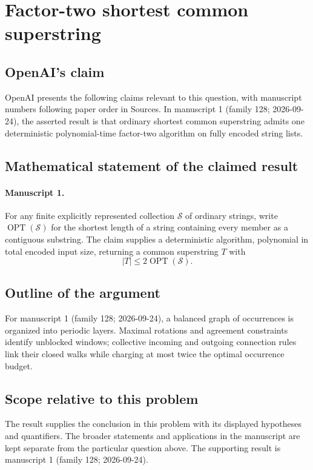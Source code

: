 \documentclass[11pt]{article}
\begin{document}
\section*{Factor-two shortest common superstring}

\subsection{OpenAI's claim}
OpenAI presents the following claims relevant to this question, with manuscript numbers following paper order in Sources. In manuscript 1 (family 128; 2026-09-24), the asserted result is that ordinary shortest common superstring admits one deterministic polynomial-time factor-two algorithm on fully encoded string lists.

\subsection{Mathematical statement of the claimed result}
\paragraph{Manuscript 1.}
For any finite explicitly represented collection $\mathcal S$ of ordinary strings, write $\operatorname{OPT}(\mathcal S)$ for the shortest length of a string containing every member as a contiguous substring. The claim supplies a deterministic algorithm, polynomial in total encoded input size, returning a common superstring $T$ with
\[
 |T|\le2\operatorname{OPT}(\mathcal S).
\]

\subsection{Outline of the argument}
For manuscript 1 (family 128; 2026-09-24), a balanced graph of occurrences is organized into periodic layers. Maximal rotations and agreement constraints identify unblocked windows; collective incoming and outgoing connection rules link their closed walks while charging at most twice the optimal occurrence budget.

\subsection{Scope relative to this problem}
The result supplies the conclusion in this problem with its displayed hypotheses and quantifiers. The broader statements and applications in the manuscript are kept separate from the particular question above. The supporting result is manuscript 1 (family 128; 2026-09-24).
\end{document}
